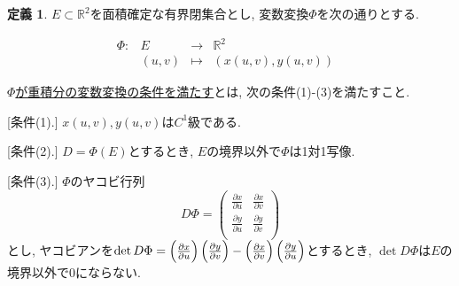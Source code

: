 \documentclass[dvipdfmx,a4paper,11pt]{article}
\newcommand{\R}{\mathbb{R}}
\theoremstyle{definition}
\newtheorem{dfn}[thm]{定義}
\newcommand{\pdrv}[2]{\frac{\partial #1}{\partial #2}}
\begin{document}
 \begin{tcolorbox}[
    colback = white,
    colframe = green!35!black,
    fonttitle = \bfseries,
    breakable = true]
    \begin{dfn}
$E \subset \R^2$を面積確定な有界閉集合とし, 変数変換$\Phi$を次の通りとする.

 $$
\begin{array}{ccccc}
\Phi: &E & \rightarrow & \R^2 & \\
&(u,v) & \longmapsto & (x(u,v),y(u,v))&
\end{array}
$$

\underline{$\Phi$が重積分の変数変換の条件を満たす}とは, 次の条件(1)-(3)を満たすこと.

[条件(1).] $x(u,v),y(u,v)$は$C^1$級である.

[条件(2).] $D = \Phi(E)$とするとき, $E$の境界以外で$\Phi$は1対1写像. 

[条件(3).] $\Phi$のヤコビ行列
$$
D\Phi=
\left(\begin{array}{cc} \pdrv{x}{u} & \pdrv{x}{v} \\ \pdrv{y}{u}& \pdrv{y}{v} \\ \end{array} \right)
$$ 
とし, ヤコビアンを$\det D\Phi = 
\Bigl( \pdrv{x}{u} \Bigr) \left( \pdrv{y}{v} \right) - \Bigl( \pdrv{x}{v}  \Bigr) \left( \pdrv{y}{u}\right)$とするとき, $\det D\Phi $は$E$の境界以外で0にならない.
 \end{dfn}
 \end{tcolorbox}
\end{document}

